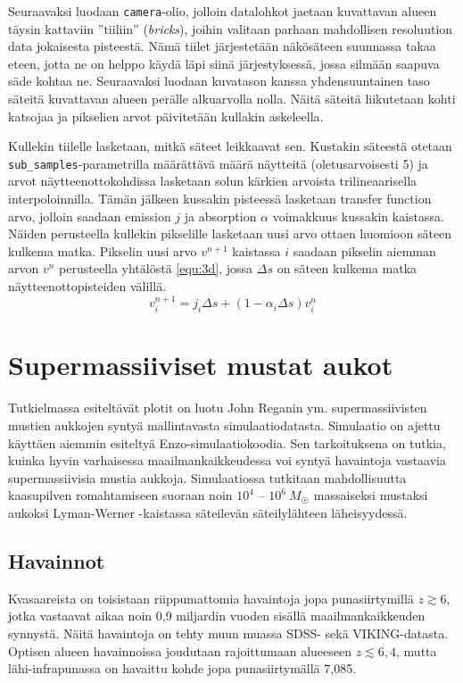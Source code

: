 \documentclass[12pt,a4paper]{article}
\begin{document}
Seuraavaksi luodaan \texttt{camera}-olio, jolloin datalohkot jaetaan kuvattavan alueen täysin kattaviin ''tiiliin'' (\textit{bricks}), joihin valitaan parhaan mahdollisen resoluution data jokaisesta pisteestä. Nämä tiilet järjestetään näkösäteen suunnassa takaa eteen, jotta ne on helppo käydä läpi siinä järjestyksessä, jossa silmään saapuva säde kohtaa ne. Seuraavaksi luodaan kuvatason kanssa yhdensuuntainen taso säteitä kuvattavan alueen perälle alkuarvolla nolla. Näitä säteitä liikutetaan kohti katsojaa ja pikselien arvot päivitetään kullakin askeleella. \cite{volume}

\begin{sloppypar}
Kullekin tiilelle lasketaan, mitkä säteet leikkaavat sen. Kustakin säteestä otetaan \texttt{sub\_samples}-parametrilla määrättävä määrä näytteitä (oletusarvoisesti 5) ja arvot näytteenottokohdissa lasketaan solun kärkien arvoista trilineaarisella interpoloinnilla. Tämän jälkeen kussakin pisteessä lasketaan transfer function arvo, jolloin saadaan emission $j$ ja absorption $\alpha$ voimakkuus kussakin kaistassa. Näiden perusteella kullekin pikselille lasketaan uusi arvo ottaen huomioon säteen kulkema matka. Pikselin uusi arvo $v^{n+1}$ kaistassa $i$ saadaan pikselin aiemman arvon $v^n$ perusteella yhtälöstä \ref{equ:3d}, jossa $\Delta s$ on säteen kulkema matka näytteenottopisteiden välillä.
\begin{equation}\label{equ:3d}
v^{n+1}_{i} =  j_{i}\Delta s + (1 - \alpha_{i}\Delta s )v^{n}_{i}
\end{equation}
\end{sloppypar}


\section{Supermassiiviset mustat aukot}
Tutkielmassa esiteltävät plotit on luotu John Reganin ym. supermassiivisten mustien aukkojen syntyä mallintavasta simulaatiodatasta. Simulaatio on ajettu käyttäen aiemmin esiteltyä Enzo-simulaatiokoodia. Sen tarkoituksena on tutkia, kuinka hyvin varhaisessa maailmankaikkeudessa voi syntyä havaintoja vastaavia supermassiivisia mustia aukkoja. Simulaatiossa tutkitaan mahdollisuutta kaasupilven romahtamiseen suoraan noin $10^4$ -- $10^6~ M_{\astrosun}$ massaiseksi mustaksi aukoksi Lyman-Werner -kaistassa säteilevän säteilylähteen läheisyydessä. \cite{rj}

\subsection{Havainnot}
Kvasaareista on toisistaan riippumattomia havaintoja jopa punasiirtymillä $z \gtrsim 6$, jotka vastaavat aikaa noin 0,9 miljardin vuoden sisällä maailmankaikkeuden synnystä. Näitä havaintoja on tehty muun muassa SDSS- sekä VIKING-datasta. Optisen alueen havainnoissa joudutaan rajoittumaan alueeseen $z \lesssim 6,4$, mutta lähi-infrapunassa on havaittu kohde jopa punasiirtymällä 7,085. \cite{fan, mortlock, venemans}
\end{document}
